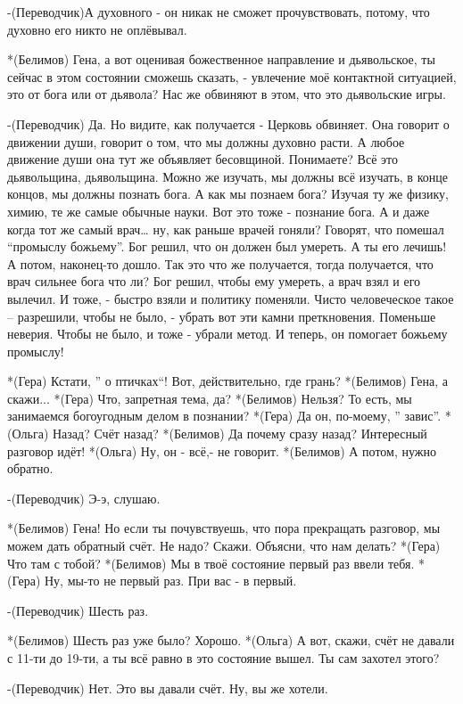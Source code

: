 -(Переводчик)А духовного - он никак не сможет прочувствовать, потому, что духовно  его никто не оплёвывал. 

*(Белимов) Гена, а вот оценивая божественное направление и дьявольское, ты сейчас в этом состоянии сможешь сказать, - увлечение моё контактной ситуацией, это от бога или от дьявола? Нас же обвиняют в этом, что это дьявольские игры.

-(Переводчик) Да. Но видите, как получается -  Церковь обвиняет. Она говорит о движении души, говорит о том, что мы должны духовно расти. А любое движение души она тут же  объявляет бесовщиной. Понимаете? Всё это дьявольщина, дьявольщина. Можно же изучать, мы должны всё изучать, в конце концов, мы должны познать бога. А как мы познаем бога? Изучая ту же физику, химию, те же самые обычные науки. Вот это тоже - познание бога. А и даже когда тот же самый врач… ну, как раньше врачей гоняли? Говорят, что помешал “промыслу божьему”. Бог решил, что он должен был умереть. А ты его лечишь! А потом, наконец-то дошло. Так это что же получается, тогда получается, что врач сильнее бога что ли? Бог решил, чтобы ему умереть, а врач взял и его вылечил. И тоже, - быстро взяли и политику поменяли. Чисто человеческое такое – разрешили, чтобы не было, - убрать вот эти камни преткновения. Поменьше неверия. Чтобы не было, и тоже - убрали метод. И теперь, он помогает божьему промыслу!

*(Гера) Кстати, ” о птичках“!  Вот, действительно, где грань? 
*(Белимов) Гена, а скажи...
*(Гера) Что, запретная тема, да?
*(Белимов) Нельзя? То есть, мы занимаемся богоугодным делом в познании?
*(Гера) Да он, по-моему, ” завис”.
*(Ольга) Назад? Счёт назад?
*(Белимов) Да почему сразу назад? Интересный разговор идёт!
*(Ольга) Ну, он  - всё,- не говорит.
*(Белимов) А потом, нужно обратно.

-(Переводчик) Э-э, слушаю.

*(Белимов) Гена! Но если ты почувствуешь, что пора прекращать разговор, мы можем дать обратный счёт. Не надо? Скажи.  Объясни, что нам делать?
*(Гера) Что там с тобой?
*(Белимов) Мы в твоё состояние первый раз ввели тебя.
*(Гера) Ну, мы-то не первый раз. При вас - в первый.

-(Переводчик) Шесть раз.

*(Белимов) Шесть раз уже было? Хорошо.
*(Ольга) А вот, скажи, счёт не давали с 11-ти до 19-ти, а ты всё равно в это состояние вышел. Ты сам захотел этого?

-(Переводчик) Нет. Это вы давали счёт. Ну, вы же хотели.

